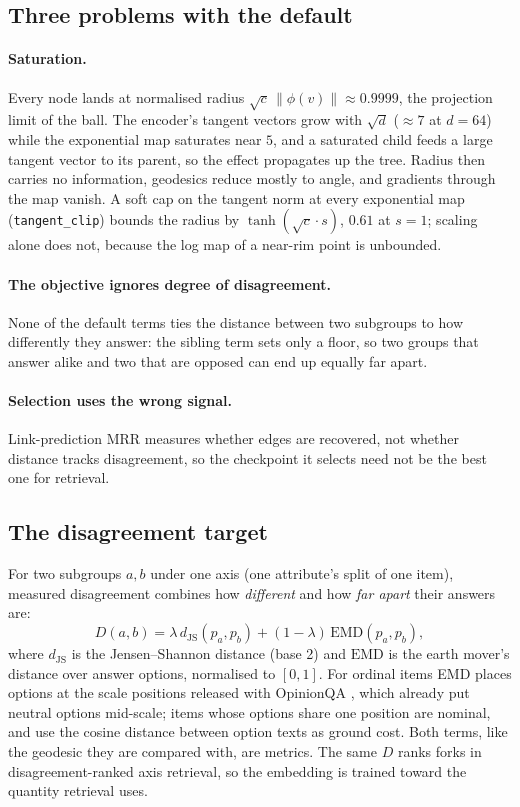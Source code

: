 \documentclass[11pt]{article}
\begin{document}
\subsection{Three problems with the default}
\paragraph{Saturation.} Every node lands at normalised radius
$\sqrt{c}\,\lVert\phi(v)\rVert \approx 0.9999$, the projection limit of the
ball. The encoder's tangent vectors grow with $\sqrt{d}$ ($\approx 7$ at
$d = 64$) while the exponential map saturates near $5$, and a saturated child
feeds a large tangent vector to its parent, so the effect propagates up the
tree. Radius then carries no information, geodesics reduce mostly to angle,
and gradients through the map vanish. A soft cap on the tangent norm at every
exponential map (\texttt{tangent\_clip}) bounds the radius by
$\tanh(\sqrt{c}\cdot s)$, $0.61$ at $s = 1$; scaling alone does not, because
the log map of a near-rim point is unbounded.

\paragraph{The objective ignores degree of disagreement.} None of the default
terms ties the distance between two subgroups to how differently they answer:
the sibling term sets only a floor, so two groups that answer alike and two
that are opposed can end up equally far apart.

\paragraph{Selection uses the wrong signal.} Link-prediction MRR measures
whether edges are recovered, not whether distance tracks disagreement, so the
checkpoint it selects need not be the best one for retrieval.

\subsection{The disagreement target}
For two subgroups $a, b$ under one axis (one attribute's split of one item),
measured disagreement combines how \emph{different} and how \emph{far apart}
their answers are:
\begin{equation}
  D(a, b) = \lambda\, d_{\mathrm{JS}}(p_a, p_b) + (1 - \lambda)\,
            \mathrm{EMD}(p_a, p_b),
  \label{eq:dis}
\end{equation}
where $d_{\mathrm{JS}}$ is the Jensen--Shannon distance (base 2) and
$\mathrm{EMD}$ is the earth mover's distance over answer options, normalised
to $[0, 1]$. For ordinal items EMD places options at the scale positions
released with OpinionQA \citep{santurkar2023whose}, which already put neutral
options mid-scale; items whose options share one position are nominal, and
use the cosine distance between option texts as ground cost. Both terms, like
the geodesic they are compared with, are metrics. The same $D$ ranks forks in
disagreement-ranked axis retrieval, so the embedding is trained toward the
quantity retrieval uses.
\end{document}
